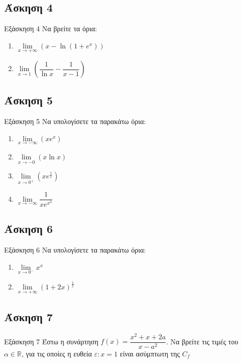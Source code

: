 \documentclass[greek]{beamer}
\begin{document}
\subsection{Άσκηση 4}
\begin{frame}[label=Άσκηση4,t]{Εξάσκηση 4}
 Να βρείτε τα όρια:
 \begin{enumerate}
  \item<1-> $\lim\limits_{x \to +\infty}{ (x-\ln (1+e^x)) }$
  \item<2-> $\lim\limits_{x \to 1}{ \left( \dfrac{1}{\ln x} - \dfrac{1}{x-1} \right)  }$
 \end{enumerate}

\end{frame}

\subsection{Άσκηση 5}
\begin{frame}[label=Άσκηση5,t]{Εξάσκηση 5}
 Να υπολογίσετε τα παρακάτω όρια:
 \begin{enumerate}
  \item<1-> $\lim\limits_{x \to -\infty}{ (xe^x) }$
  \item<2-> $\lim\limits_{x \to -0}{ (x\ln x) }$
  \item<3-> $\lim\limits_{x \to 0^+}{ \left( xe^{\frac{1}{x}} \right)  }$
  \item<4-> $\lim\limits_{x \to -\infty}{ \dfrac{1}{xe^{x^3}} }$
 \end{enumerate}

\end{frame}

\subsection{Άσκηση 6}
\begin{frame}[label=Άσκηση6,t]{Εξάσκηση 6}
 Να υπολογίσετε τα παρακάτω όρια:
 \begin{enumerate}
  \item<1-> $\lim\limits_{x \to 0^-}{ x^x }$
  \item<2-> $\lim\limits_{x \to +\infty}{ \left( 1+2x \right)^{\frac{1}{x}}  }$
 \end{enumerate}

\end{frame}

\subsection{Άσκηση 7}
\begin{frame}[label=Άσκηση7,t]{Εξάσκηση 7}
 Έστω η συνάρτηση $f(x)=\dfrac{x^2+x+2a}{x-a^2}$. Να βρείτε τις τιμές του $α\in\mathbb{R}$, για τις οποίες η ευθεία $ε:x=1$ είναι ασύμπτωτη της $C_f$

\end{frame}
\end{document}

